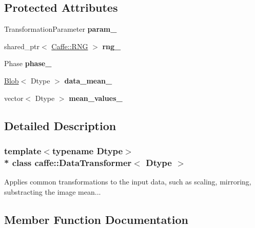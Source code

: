 \subsection*{Protected Attributes}
\begin{DoxyCompactItemize}
\item 
Transformation\+Parameter {\bfseries param\+\_\+}\hypertarget{classcaffe_1_1DataTransformer_a7d0dd7f13701a450c37c989a39ac50e0}{}\label{classcaffe_1_1DataTransformer_a7d0dd7f13701a450c37c989a39ac50e0}

\item 
shared\+\_\+ptr$<$ \hyperlink{classcaffe_1_1Caffe_1_1RNG}{Caffe\+::\+R\+NG} $>$ {\bfseries rng\+\_\+}\hypertarget{classcaffe_1_1DataTransformer_a28e1ac0553c09e21036f671b73a1e0dd}{}\label{classcaffe_1_1DataTransformer_a28e1ac0553c09e21036f671b73a1e0dd}

\item 
Phase {\bfseries phase\+\_\+}\hypertarget{classcaffe_1_1DataTransformer_a30cf039d7452683f4f91e022fd8eec32}{}\label{classcaffe_1_1DataTransformer_a30cf039d7452683f4f91e022fd8eec32}

\item 
\hyperlink{classcaffe_1_1Blob}{Blob}$<$ Dtype $>$ {\bfseries data\+\_\+mean\+\_\+}\hypertarget{classcaffe_1_1DataTransformer_a74d5da590321195fdaa7d2c9f6b372fd}{}\label{classcaffe_1_1DataTransformer_a74d5da590321195fdaa7d2c9f6b372fd}

\item 
vector$<$ Dtype $>$ {\bfseries mean\+\_\+values\+\_\+}\hypertarget{classcaffe_1_1DataTransformer_a04a2c85e464047c84b98aa677ad19d94}{}\label{classcaffe_1_1DataTransformer_a04a2c85e464047c84b98aa677ad19d94}

\end{DoxyCompactItemize}


\subsection{Detailed Description}
\subsubsection*{template$<$typename Dtype$>$\\*
class caffe\+::\+Data\+Transformer$<$ Dtype $>$}

Applies common transformations to the input data, such as scaling, mirroring, substracting the image mean... 

\subsection{Member Function Documentation}
